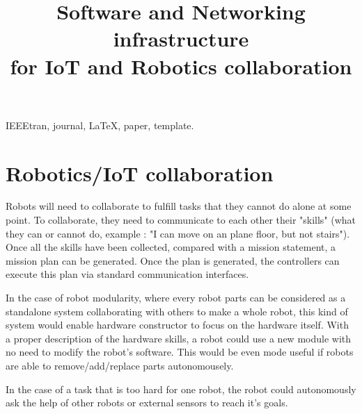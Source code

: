 \documentclass[conference]{IEEEtran}
\begin{document}
\title{Software and Networking infrastructure \\for IoT and Robotics collaboration}

\author{
\and
{}
\and
{}
}

\maketitle

\begin{abstract}
\end{abstract}

\begin{IEEEkeywords}
IEEEtran, journal, \LaTeX, paper, template.
\end{IEEEkeywords}

\IEEEpeerreviewmaketitle

\section{Robotics/IoT collaboration}

Robots will need to collaborate to fulfill tasks that they cannot do alone at some point.
To collaborate, they need to communicate to each other their "skills" (what they can or cannot do, example : "I can move on an plane floor, but not stairs").
Once all the skills have been collected, compared with a mission statement, a mission plan can be generated.
Once the plan is generated, the controllers can execute this plan via standard communication interfaces.

In the case of robot modularity, where every robot parts can be considered as a standalone system collaborating with others to make a whole robot, this kind of system would enable hardware constructor to focus on the hardware itself.
With a proper description of the hardware skills, a robot could use a new module with no need to modify the robot's software.
This would be even mode useful if robots are able to remove/add/replace parts autonomousely.

In the case of a task that is too hard for one robot, the robot could autonomously ask the help of other robots or external sensors to reach it's goals.
\end{document}
